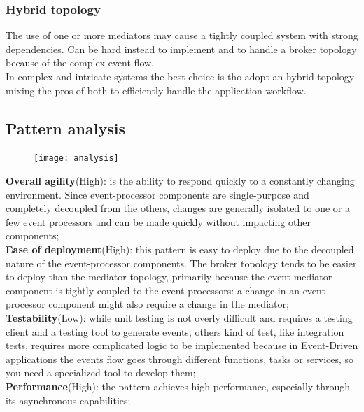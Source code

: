 \documentclass[11pt]{article} %
\begin{document}
\subsubsection{Hybrid topology}
The use of one or more mediators may cause a tightly coupled system with strong dependencies. Can be hard instead to implement and to handle a broker topology because of the complex event flow.\\
In complex and intricate systems the best choice is tho adopt an hybrid topology mixing the pros of both to efficiently handle the application workflow. 


\subsection{Pattern analysis}
\begin{figure} [H]
	\centering
	\texttt{[image: analysis]}
\end{figure}
 \textbf{Overall agility}(\color{darkgreen}High\color{black}): is the ability to respond quickly to a constantly changing environment. Since event-processor components are single-purpose and completely decoupled from the others, changes are generally isolated to one or a few event processors and can be made quickly without impacting other components; \\
 
 \textbf{Ease of deployment}(\color{darkgreen}High\color{black}): this pattern is easy to deploy due to the decoupled nature of the event-processor components. The broker topology tends to be easier to deploy than the mediator topology, primarily because the event mediator component is tightly coupled to the event processors: a change in an event processor component might also require a change in the mediator; \\
 
 \textbf{Testability}(\color{red}Low\color{black}): while unit testing is not overly difficult and requires a testing client and a testing tool to generate events, others kind of test, like integration tests, requires more complicated logic to be implemented because in Event-Driven applications the events flow goes through different functions, tasks or services, so you need a specialized tool to develop them; \\
 
 \textbf{Performance}(\color{darkgreen}High\color{black}): the pattern achieves high performance, especially through its asynchronous capabilities; \\
 
\end{document}
